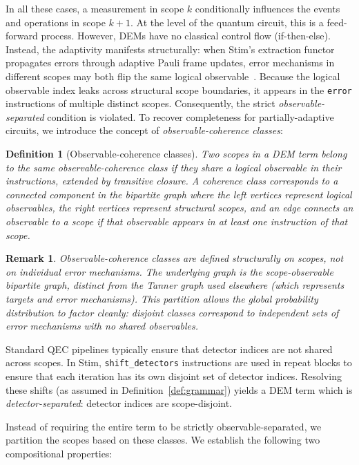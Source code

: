 \documentclass[11pt,a4paper]{article}
\newtheorem{definition}[theorem]{Definition}
\newtheorem{remark}[theorem]{Remark}
\begin{document}
In all these cases, a measurement in scope $k$ conditionally influences the events and operations in scope $k+1$. At the level of the quantum circuit, this is a feed-forward process. 
However, DEMs have no classical control flow (if-then-else). Instead, the adaptivity manifests structurally: when Stim's extraction functor propagates errors through adaptive Pauli frame updates, error mechanisms in different scopes may both flip the same logical observable~\cite{gidney2021stim}. Because the logical observable index leaks across structural scope boundaries, it appears in the \texttt{error} instructions of multiple distinct scopes. 
Consequently, the strict \emph{observable-separated} condition is violated.
To recover completeness for partially-adaptive circuits, we introduce the concept of \emph{observable-coherence classes}:

\begin{definition}[Observable-coherence classes]
Two scopes in a DEM term belong to the same \emph{observable-coherence} class if they share a logical observable in their instructions, extended by transitive closure. A coherence class corresponds to a connected component in the bipartite graph where the left vertices represent logical observables, the right vertices represent structural scopes, and an edge connects an observable to a scope if that observable appears in at least one instruction of that scope.
\end{definition}

\begin{remark}
Observable-coherence classes are defined structurally on \emph{scopes}, not on individual error mechanisms. The underlying graph is the scope-observable bipartite graph, distinct from the Tanner graph used elsewhere (which represents targets and error mechanisms). This partition allows the global probability distribution to factor cleanly: disjoint classes correspond to independent sets of error mechanisms with no shared observables.
\end{remark}

Standard QEC pipelines typically ensure that detector indices are not shared across scopes. In Stim, \texttt{shift\_detectors} instructions are used in repeat blocks to ensure that each iteration has its own disjoint set of detector indices. Resolving these shifts (as assumed in Definition~\ref{def:grammar}) yields a DEM term which is \emph{detector-separated}: detector indices are scope-disjoint. 

Instead of requiring the entire term to be strictly observable-separated, we partition the scopes based on these classes. We establish the following two compositional properties:
\end{document}
